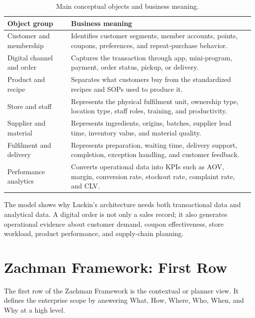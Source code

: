 \documentclass[12pt,a4paper]{article}
\begin{document}
\begin{table}[H]
\centering
\small
\caption{Main conceptual objects and business meaning.}
\begin{tabularx}{\textwidth}{P{3.6cm}Y}
\toprule
\textbf{Object group} & \textbf{Business meaning} \\
\midrule
Customer and membership & Identifies customer segments, member accounts, points, coupons, preferences, and repeat-purchase behavior. \\
Digital channel and order & Captures the transaction through app, mini-program, payment, order status, pickup, or delivery. \\
Product and recipe & Separates what customers buy from the standardized recipes and SOPs used to produce it. \\
Store and staff & Represents the physical fulfilment unit, ownership type, location type, staff roles, training, and productivity. \\
Supplier and material & Represents ingredients, origins, batches, supplier lead time, inventory value, and material quality. \\
Fulfilment and delivery & Represents preparation, waiting time, delivery support, completion, exception handling, and customer feedback. \\
Performance analytics & Converts operational data into KPIs such as AOV, margin, conversion rate, stockout rate, complaint rate, and CLV. \\
\bottomrule
\end{tabularx}
\end{table}

The model shows why Luckin's architecture needs both transactional data and analytical data. A digital order is not only a sales record; it also generates operational evidence about customer demand, coupon effectiveness, store workload, product performance, and supply-chain planning.

\section{Zachman Framework: First Row}

The first row of the Zachman Framework is the contextual or planner view. It defines the enterprise scope by answering What, How, Where, Who, When, and Why at a high level.
\end{document}

